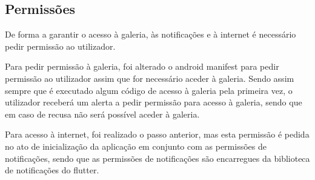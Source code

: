 \subsection{Permissões}

De forma a garantir o acesso à galeria, às notificações e à internet é necessário pedir permissão ao utilizador.

Para pedir permissão à galeria, foi alterado o android manifest para pedir permissão ao utilizador assim que for necessário aceder à galeria. Sendo assim sempre que é executado algum código de acesso à galeria pela primeira vez, o utilizador receberá um alerta a pedir permissão para acesso à galeria, sendo que em caso de recusa não será possível aceder à galeria.

Para acesso à internet, foi realizado o passo anterior, mas esta permissão é pedida no ato de inicialização da aplicação em conjunto com as permissões de notificações, sendo que as permissões de notificações são encarregues da biblioteca de notificações do flutter.